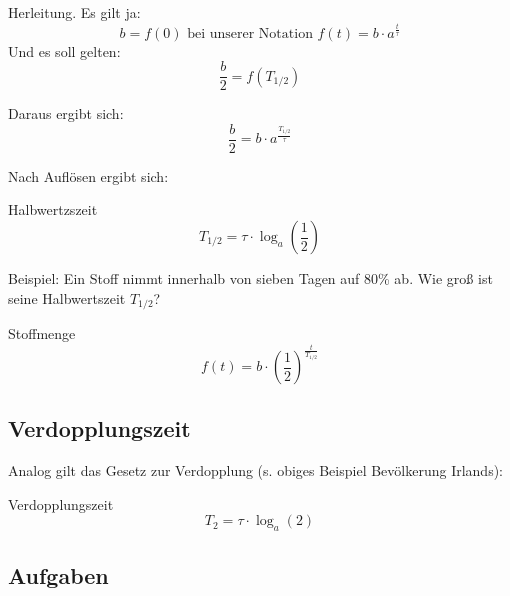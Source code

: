   Herleitung. Es gilt ja:
  $$b=f(0) \text{ bei unserer Notation } f(t) = b\cdot{}a^\frac{t}\tau$$
  Und es soll gelten:
  $$\frac{b}2 = f(T_{1/2})$$

  Daraus ergibt sich:
  $$\frac{b}2 = b\cdot{}a^{\frac{T_{1/2}}{\tau}}$$

    Nach Auflösen ergibt sich:


    
\begin{gesetz}{Halbwertzszeit}{}
  $$T_{1/2} = \tau\cdot{}\log_a\left(\frac12\right)$$
\end{gesetz}

\newpage
Beispiel: Ein Stoff nimmt innerhalb von sieben Tagen auf 80\% ab. Wie
groß ist seine Halbwertszeit $T_{1/2}$?


\begin{gesetz}{Stoffmenge}{}
  $$f(t) = b\cdot{}\left(\frac12\right)^\frac{t}{T_{1/2}}$$
\end{gesetz}


\subsection{Verdopplungszeit}

Analog gilt das Gesetz zur Verdopplung (s. obiges Beispiel Bevölkerung Irlands):
\begin{gesetz}{Verdopplungszeit}{}
  $$T_2 = \tau\cdot{}\log_a(2)$$
\end{gesetz}
\newpage


\subsection*{Aufgaben}

